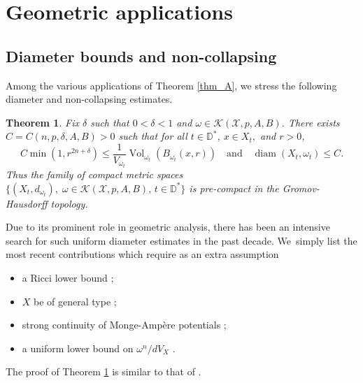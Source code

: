 \documentclass[11pt]{article}
\numberwithin{equation}{section}
\DeclareMathOperator{\diam}{diam}
\DeclareMathOperator{\Vol}{Vol}
\newtheorem{theorem}{Theorem}[section]
\theoremstyle{definition}
\newcommand{\D}{\mathbb D}
\begin{document}
\section{Geometric applications}

\subsection{Diameter bounds and non-collapsing}

Among the various applications of Theorem \ref{thm_A}, we stress the following diameter and non-collapsing estimates.

\begin{theorem} \label{thm:diameter}
Fix $\delta$ such that $0<\delta<1$ and $\omega \in {\mathcal K}(\mathcal{X},p,A,B)$.
There exists $C=C(n,p,\delta,A,B)>0$ such that for all $ t \in \D^*$, $x \in X_t, $ and $r>0$,
\[
C \min(1,r^{2n+\delta}) \leq \frac{1}{V_{\omega_t}} \Vol_{\omega_t}(B_{\omega_t}(x,r))
\quad \text{and} \quad
\diam(X_t,\omega_t) \leq C.
\]
Thus the family of compact metric spaces
$\{ (X_t,d_{\omega_t}), \; \omega \in {\mathcal K}(\mathcal{X},p,A,B), \, t \in \D^* \}$
is pre-compact in the Gromov-Hausdorff topology.
\end{theorem}

Due to its prominent role in geometric analysis, there has been an intensive search for such uniform diameter estimates in the past decade. We~simply list the most recent contributions which require as an extra assumption
\begin{itemize}
\item a Ricci lower bound \cite{LTZ17,FGS20,GS22};
\item $X$ be of general type \cite{Bam18,Wang18,JS22};
\item strong continuity of Monge-Ampère potentials \cite{Li21,GGZ23,V23};
\item a uniform lower bound on $\omega^n/dV_X$ \cite{GPS22,GPSS22,GPSS23}.
\end{itemize}

The proof of Theorem \ref{thm:diameter} is similar to that of \cite[Th.\,1.1]{GPSS22}.
\end{document}
